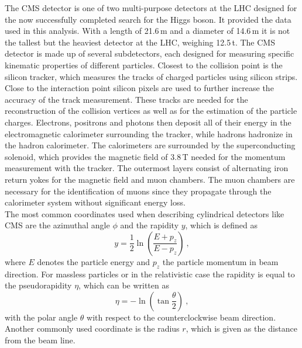 The CMS detector is one of two multi-purpose detectors at the LHC designed for the now successfully completed search for the Higgs boson. It provided the data used in this analysis. With a length of 21.6\,m and a diameter of 14.6\,m it is not the tallest but the heaviest detector at the LHC, weighing 12.5\,t. The CMS detector is made up of several subdetectors, each designed for measuring specific kinematic properties of different particles. Closest to the collision point is the silicon tracker, which measures the tracks of charged particles using silicon strips. Close to the interaction point silicon pixels are used to further increase the accuracy of the track measurement. These tracks are needed for the reconstruction of the collision vertices as well as for the estimation of the particle charges. Electrons, positrons and photons then deposit all of their energy in the electromagnetic calorimeter surrounding the tracker, while hadrons hadronize in the hadron calorimeter. The calorimeters are surrounded by the superconducting solenoid, which provides the magnetic field of 3.8\,T needed for the momentum measurement with the tracker. The outermost layers consist of alternating iron return yokes for the magnetic field and muon chambers. The muon chambers are necessary for the identification of muons since they propagate through the calorimeter system without significant energy loss.\\

\noindent The most common coordinates used when describing cylindrical detectors like CMS are the azimuthal angle $\phi$ and the rapidity $y$, which is defined as
\begin{equation}
y = \frac{1}{2} \ln \left( \frac{E+p_z}{E-p_z} \right) ~,
\end{equation}
where $E$ denotes the particle energy and $p_z$ the particle momentum in beam direction. For massless particles or in the relativistic case the rapidity is equal to the pseudorapidity $\eta$, which can be written as
\begin{equation}
\eta = -\ln \left( \tan \frac{\theta}{2} \right) ~,
\end{equation}
with the polar angle $\theta$ with respect to the counterclockwise beam direction. Another commonly used coordinate is the radius $r$, which is given as the distance from the beam line.\\

